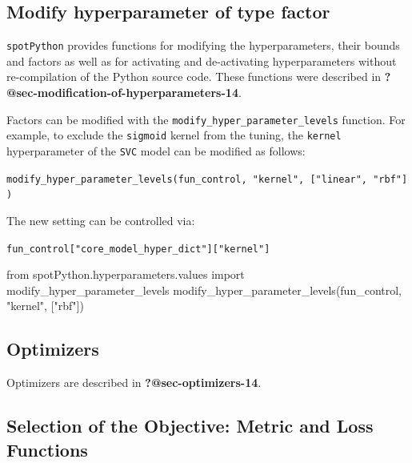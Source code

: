 \documentclass[
  letterpaper,
  DIV=11,
  numbers=noendperiod]{scrreprt}
\newenvironment{Shaded}{\begin{snugshade}}{\end{snugshade}}
\newcommand{\ImportTok}[1]{\textcolor[rgb]{0.00,0.46,0.62}{#1}}
\newcommand{\NormalTok}[1]{\textcolor[rgb]{0.00,0.23,0.31}{#1}}
\newcommand{\StringTok}[1]{\textcolor[rgb]{0.13,0.47,0.30}{#1}}
\begin{document}
\hypertarget{modify-hyperparameter-of-type-factor-3}{%
\subsection{Modify hyperparameter of type
factor}\label{modify-hyperparameter-of-type-factor-3}}

\texttt{spotPython} provides functions for modifying the
hyperparameters, their bounds and factors as well as for activating and
de-activating hyperparameters without re-compilation of the Python
source code. These functions were described in
\textbf{?@sec-modification-of-hyperparameters-14}.

Factors can be modified with the
\texttt{modify\_hyper\_parameter\_levels} function. For example, to
exclude the \texttt{sigmoid} kernel from the tuning, the \texttt{kernel}
hyperparameter of the \texttt{SVC} model can be modified as follows:

\texttt{modify\_hyper\_parameter\_levels(fun\_control,\ "kernel",\ {[}"linear",\ "rbf"{]})}

The new setting can be controlled via:

\texttt{fun\_control{[}"core\_model\_hyper\_dict"{]}{[}"kernel"{]}}

\begin{Shaded}
\begin{Highlighting}[]
\ImportTok{from}\NormalTok{ spotPython.hyperparameters.values }\ImportTok{import}\NormalTok{ modify\_hyper\_parameter\_levels}
\NormalTok{modify\_hyper\_parameter\_levels(fun\_control, }\StringTok{"kernel"}\NormalTok{, [}\StringTok{"rbf"}\NormalTok{])}
\end{Highlighting}
\end{Shaded}

\hypertarget{sec-optimizers-18}{%
\subsection{Optimizers}\label{sec-optimizers-18}}

Optimizers are described in \textbf{?@sec-optimizers-14}.

\hypertarget{selection-of-the-objective-metric-and-loss-functions-2}{%
\subsection{Selection of the Objective: Metric and Loss
Functions}\label{selection-of-the-objective-metric-and-loss-functions-2}}
\end{document}
